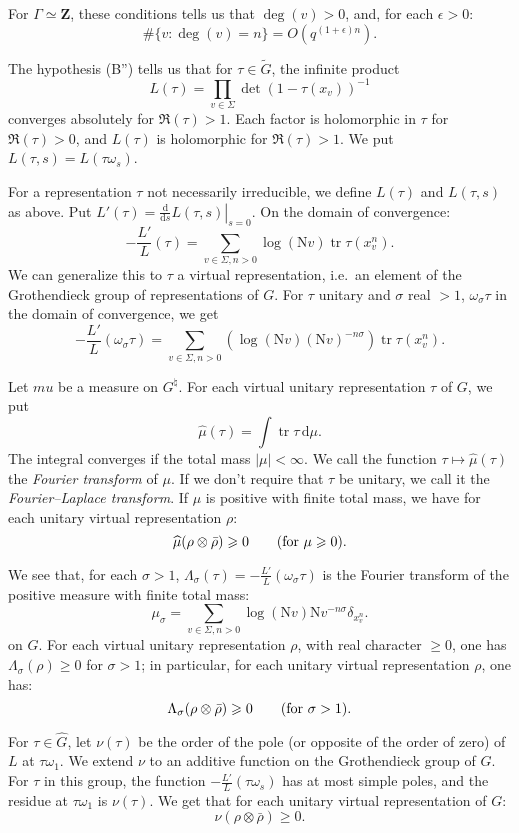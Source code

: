 \documentclass{article}
\DeclareMathOperator{\tr}{tr}
\newcommand{\bZ}{\mathbf{Z}}
\newcommand{\dd}{\mathrm{d}}
\newcommand{\N}{\mathrm{N}}
\begin{document}
For $\Gamma\simeq \bZ$, these conditions tells us that $\deg(v)>0$, and, for 
each $\epsilon>0$:
\[
	\#\{v : \deg(v)=n\} = O(q^{(1+\epsilon)n}) .
\]

The hypothesis (B'') tells us that for $\tau\in \widetilde G$, the infinite 
product 
\[
	L(\tau) = \prod_{v\in \Sigma} \det(1-\tau(x_v))^{-1} 
\]
converges absolutely for $\Re(\tau)>1$. Each factor is holomorphic in $\tau$ 
for $\Re(\tau)>0$, and $L(\tau)$ is holomorphic for $\Re(\tau)>1$. We put 
$L(\tau,s)=L(\tau\omega_s)$. 

For a representation $\tau$ not necessarily irreducible, we define $L(\tau)$ 
and $L(\tau,s)$ as above. Put 
$L'(\tau)=\left.\frac{\dd}{\dd s} L(\tau,s)\right|_{s=0}$. On the domain of 
convergence:
\[
	-\frac{L'}{L}(\tau) = \sum_{v\in \Sigma,n>0} \log(\N v) \tr \tau(x_v^n) .
\]
We can generalize this to $\tau$ a virtual representation, i.e.~an element of 
the Grothendieck group of representations of $G$. For $\tau$ unitary and 
$\sigma$ real $>1$, $\omega_\sigma \tau$ in the domain of convergence, we get 
\[
	-\frac{L'}{L}(\omega_\sigma\tau) = \sum_{v\in\Sigma,n>0} (\log(\N v) (\N v)^{-n\sigma}) \tr \tau(x_v^n) .
\]

Let $mu$ be a measure on $G^\natural$. For each virtual unitary representation 
$\tau$ of $G$, we put 
\[
	\widehat\mu(\tau) = \int \tr \tau\, \dd\mu .
\]
The integral converges if the total mass $|\mu|<\infty$. We call the function 
$\tau\mapsto\widehat\mu(\tau)$ the \emph{Fourier transform} of $\mu$. If we 
don't require that $\tau$ be unitary, we call it the \emph{Fourier--Laplace 
transform}. If $\mu$ is positive with finite total mass, we have for each 
unitary virtual representation $\rho$:
\[
	\widehat\mu(\rho\otimes \bar\rho)\geqslant 0 \qquad \textnormal{(for $\mu\geqslant 0$).}
\]

We see that, for each $\sigma>1$, 
$\Lambda_\sigma(\tau) = -\frac{L'}{L}(\omega_\sigma\tau)$ is the Fourier 
transform of the positive measure with finite total mass:
\[
	\mu_\sigma = \sum_{v\in\Sigma,n>0} \log(\N v) \N v^{-n\sigma} \delta_{x_v^n} .
\]
on $G$. For each virtual unitary representation $\rho$, with real character 
$\geqslant 0$, one has $\Lambda_\sigma(\rho)\geqslant 0$ for $\sigma>1$; in 
particular, for each unitary virtual representation $\rho$, one has:
\[
	\Lambda_\sigma(\rho\otimes\bar\rho)\geqslant 0 \qquad \textnormal{(for $\sigma>1$).}
\]

For $\tau\in \widehat G$, let $\nu(\tau)$ be the order of the pole (or opposite 
of the order of zero) of $L$ at $\tau\omega_1$. We extend $\nu$ to an additive 
function on the Grothendieck group of $G$. For $\tau$ in this group, the 
function $-\frac{L'}{L}(\tau\omega_s)$ has at most simple poles, and the residue 
at $\tau\omega_1$ is $\nu(\tau)$. We get that for each unitary virtual 
representation of $G$:
\[
	\nu(\rho\otimes\bar\rho)\geqslant 0 .
\]
\end{document}
